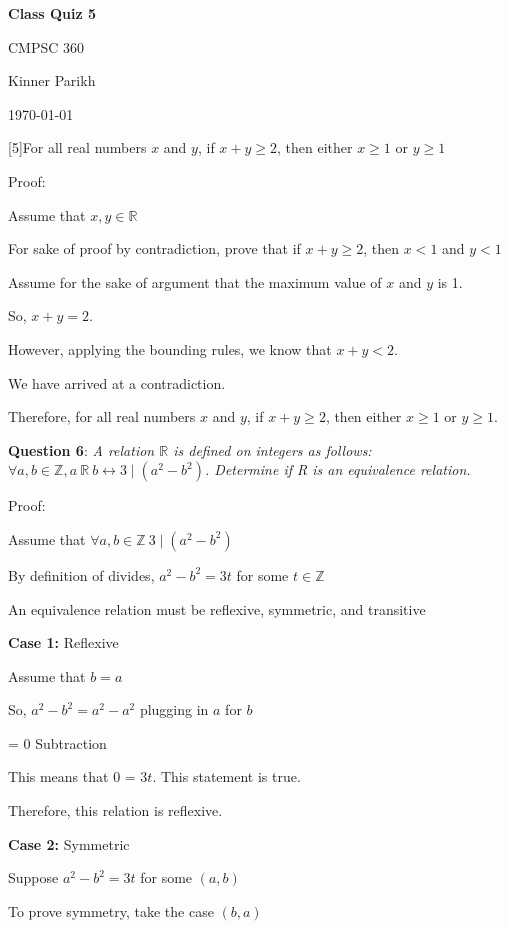 \documentclass{article} %
\newcommand{\question}[2][]{\begin{flushleft}
        \textbf{Question #1}: \textit{#2}

\end{flushleft}}
\newcommand{\maketitletwo}[2][]{\begin{center}
        \Large{\textbf{Class Quiz #1}
            
            CMPSC 360} %
        \vspace{5pt}
        
        \normalsize{Kinner Parikh  %
        
        \today}        %
        \vspace{15pt}
        
\end{center}}
\begin{document}
    \maketitletwo[5]  %
    
    \question[5]{For all real numbers $x$ and $y$, if $x + y \geq 2$, then either $x \geq 1$ or $y \geq 1$}

    Proof:
    
    Assume that $x, y \in \mathbb{R}$
    
    For sake of proof by contradiction, prove that if $x + y \geq 2$, then $x < 1$ and $y < 1$

    Assume for the sake of argument that the maximum value of $x$ and $y$ is 1.

    So, $x + y = 2$. 

    However, applying the bounding rules, we know that $x + y < 2$.

    We have arrived at a contradiction.

    Therefore, for all real numbers $x$ and $y$, if $x + y \geq 2$, then either $x \geq 1$ or $y \geq 1$.

    \newpage

    \question[6]{A relation $\mathbb{R}$ is defined on integers as follows: $\forall a, b \in \mathbb{Z}, a\ \mathbb{R}\ b \leftrightarrow 3 \mid (a^2-b^2)$. Determine if R is an equivalence relation.}

    Proof:

    Assume that $\forall a, b \in \mathbb{Z}\ 3 \mid (a^2-b^2)$

    By definition of divides, $a^2 - b^2 = 3t$ for some $t \in \mathbb{Z}$

    An equivalence relation must be reflexive, symmetric, and transitive

    \textbf{Case 1:} Reflexive

    \tabto{1cm} Assume that $b = a$

    \tabto{1cm} So, $a^2 - b^2 = a^2 - a^2$ \tabto*{5cm} plugging in $a$ for $b$

    \tabto{2.75cm} = 0 \tabto*{5cm} Subtraction

    \tabto{1cm} This means that 0 = $3t$. This statement is true.

    \tabto{1cm} Therefore, this relation is reflexive.

    \textbf{Case 2:} Symmetric

    \tabto{1cm} Suppose $a^2 - b^2 = 3t$ for some $(a, b)$
    
    \tabto{1cm} To prove symmetry, take the case $(b, a)$
\end{document}
